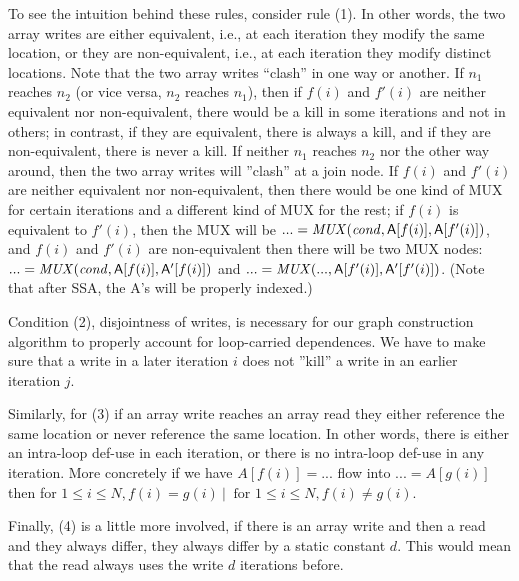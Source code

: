 To see the intuition behind these rules, consider rule (1). 
In other words, the two array writes are either equivalent, i.e., at each iteration they modify the same
location, or they are non-equivalent, i.e., at each iteration they modify distinct locations. Note that the two array writes
``clash'' in one way or another. If $n_1$ reaches $n_2$ (or vice versa, $n_2$ reaches $n_1$), then if $f(i)$ and $f'(i)$ 
are neither equivalent nor non-equivalent, there would be a kill in some iterations and not in others; in contrast, if
they are equivalent, there is always a kill, and if they are non-equivalent, there is never a kill. If neither $n_1$ reaches
$n_2$ nor the other way around, then the two array writes will ''clash'' at a join node. If $f(i)$ and $f'(i)$ are neither 
equivalent nor non-equivalent, then there would be one kind of MUX for certain iterations and a different kind of MUX 
for the rest; if $f(i)$ is equivalent to $f'(i)$, then the MUX will be $... = \mathit{MUX}(\mathit{cond}, {{\sf A}}[f(i)], {{\sf A}[f'(i)]})$, and 
$f(i)$ and $f'(i)$ are non-equivalent then there will be two MUX nodes: $... = \mathit{MUX}(\mathit{cond}, {{\sf A}}[f(i)], {{\sf A}'[f(i)]})$
and $... = \mathit{MUX}(..., {{\sf A}}[f'(i)], {{\sf A}'[f'(i)]})$. (Note that after SSA, the A's will be properly indexed.)

Condition (2), disjointness of writes, is necessary for our graph construction algorithm to properly account
for loop-carried dependences. We have to make sure that a write in a later iteration $i$ does not ''kill'' a write in an earlier iteration $j$.

Similarly, for (3) if an array write reaches an array read they either reference 
the same location or never reference the same location. In other words, there is either an intra-loop 
def-use in each iteration, or there is no intra-loop def-use in any iteration. 
More concretely if we have $A[f(i)] = ...$ flow into $... = A[g(i)]$ then for $1 \le i \le N, f(i) = g(i) ~ | ~ \mbox{ for } 1 \le i \le N, f(i) \neq g(i)$. 

Finally, (4) is a little more involved, if there is an array write and then a read and they always differ, 
they always differ by a static constant $d$. This would mean that the read always uses the write $d$ iterations before.


